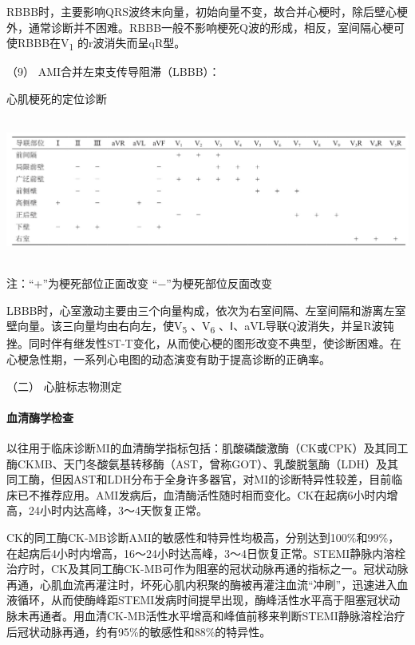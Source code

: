 RBBB时，主要影响QRS波终末向量，初始向量不变，故合并心梗时，除后壁心梗外，通常诊断并不困难。RBBB一般不影响梗死Q波的形成，相反，室间隔心梗可使RBBB在V\textsubscript{1}
的r波消失而呈qR型。

\hypertarget{text00312.htmlux5cux23CHP10-8-2-2-2-1-4-9}{}
（9） AMI合并左束支传导阻滞（LBBB）：

\begin{table}[htbp]
{\centering
\caption{心肌梗死的定位诊断}
\label{tab108-1}
\includegraphics[width=6.59375in,height=1.86458in]{./images/Image00481.jpg}}

{\small
注：“+”为梗死部位正面改变 “−”为梗死部位反面改变
}
\end{table}



LBBB时，心室激动主要由三个向量构成，依次为右室间隔、左室间隔和游离左室壁向量。该三向量均由右向左，使V\textsubscript{5}
、V\textsubscript{6}
、Ⅰ、aVL导联Q波消失，并呈R波钝挫。同时伴有继发性ST-T变化，从而使心梗的图形改变不典型，使诊断困难。在心梗急性期，一系列心电图的动态演变有助于提高诊断的正确率。

\hypertarget{text00312.htmlux5cux23CHP10-8-2-2-2-2}{}
（二） 心脏标志物测定

\paragraph{血清酶学检查}

以往用于临床诊断MI的血清酶学指标包括：肌酸磷酸激酶（CK或CPK）及其同工酶CKMB、天门冬酸氨基转移酶（AST，曾称GOT）、乳酸脱氢酶（LDH）及其同工酶，但因AST和LDH分布于全身许多器官，对MI的诊断特异性较差，目前临床已不推荐应用。AMI发病后，血清酶活性随时相而变化。CK在起病6小时内增高，24小时内达高峰，3～4天恢复正常。

CK的同工酶CK-MB诊断AMI的敏感性和特异性均极高，分别达到100\%和99\%，在起病后4小时内增高，16～24小时达高峰，3～4日恢复正常。STEMI静脉内溶栓治疗时，CK及其同工酶CK-MB可作为阻塞的冠状动脉再通的指标之一。冠状动脉再通，心肌血流再灌注时，坏死心肌内积聚的酶被再灌注血流“冲刷”，迅速进入血液循环，从而使酶峰距STEMI发病时间提早出现，酶峰活性水平高于阻塞冠状动脉未再通者。用血清CK-MB活性水平增高和峰值前移来判断STEMI静脉溶栓治疗后冠状动脉再通，约有95\%的敏感性和88\%的特异性。


